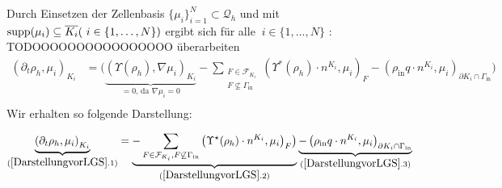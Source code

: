 Durch Einsetzen der Zellenbasis $ \{\mu_i\}_{i=1}^N \subset \mathcal{Q}_h $  und mit $ \operatorname{supp}(\mu_i) \subseteq \overline{K_i} (\ i \in \{1, \dots , N\})$ ergibt sich für alle $\ i \in \{1, \dots , N\}$ : \\
TODOOOOOOOOOOOOOOOO überarbeiten
\begin{align*} 
\left(\partial_t \rho_h, \mu_i  \right)_{K_i}  &= \bigg( \underbrace{(\Upsilon(\rho_h), \nabla\mu_i)_{K_i}}_{=0 \text{, da } \nabla \mu_i = 0} - \sum_{\substack{F \in \mathcal{F}_{K_i} \\ F \not\subseteq \Gamma_{\text{in}}}} \left(\Upsilon^*(\rho_h) \cdot n^{K_i}, \mu_i \right)_{F} - \left(\rho_{\text{in}} q \cdot n^{K_i}, \mu_i \right)_{\partial K_i \cap \Gamma_{\text{in}}} \bigg) \\
\end{align*}
Wir erhalten so folgende Darstellung:

\begin{align}
\label{DarstellungvorLGS}
\underbrace{\left(\partial_t \rho_h, \mu_i  \right)_{K_i}}_{(\ref{DarstellungvorLGS}.1)} = 
\underbrace{-  \sum_{F \in \mathcal{F}_{K_i} , F \not \subseteq \Gamma_{\text{in}}}\left(\Upsilon^{\star}(\rho_h)\cdot n^{K_i},\mu_i\big)_F \right)}_{(\ref{DarstellungvorLGS}.2)} \underbrace{- \left(\rho_{\text{in}}q\cdot n^{K_i},\mu_i \right)_{\partial K_i \cap \Gamma_{\text{in}}}}_{(\ref{DarstellungvorLGS}.3)}
\end{align}

